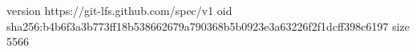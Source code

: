 version https://git-lfs.github.com/spec/v1
oid sha256:b4b6f3a3b773ff18b538662679a790368b5b0923e3a63226f2f1dcff398c6197
size 5566

